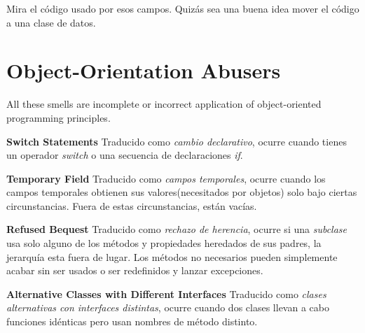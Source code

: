 \documentclass[11pt,a4paper,oneside]{book}
\begin{document}
Mira el código usado por esos campos. Quizás sea una buena idea mover el código a una clase de datos. 


    
    
    



\section{Object-Orientation Abusers} 
\label{Object-OrientationAbusers}
All these smells are incomplete or incorrect application of object-oriented programming principles.
    \newline
    
    \textbf{Switch Statements} \newline
    Traducido como \textit{cambio declarativo}, ocurre cuando tienes un operador \textit{switch} o una secuencia de declaraciones \textit{if}.
    \newline
    
    \textbf{Temporary Field}  \newline
    Traducido como \textit{campos temporales}, ocurre cuando los campos temporales obtienen sus valores(necesitados por objetos) solo bajo ciertas circunstancias. Fuera de estas circunstancias, están vacías.
    \newline
    
    \textbf{Refused Bequest}  \newline
    Traducido como \textit{rechazo de herencia}, ocurre si una \textit{subclase} usa solo alguno de los métodos y propiedades heredados de sus padres, la jerarquía esta fuera de lugar. Los métodos no necesarios pueden simplemente acabar sin ser usados o ser redefinidos y lanzar excepciones.
    \newline
    
    \textbf{Alternative Classes with Different Interfaces}  \newline
    Traducido como \textit{clases alternativas con interfaces distintas}, ocurre cuando dos clases llevan a cabo funciones idénticas pero usan nombres de método distinto.
    \newline



\end{document}
